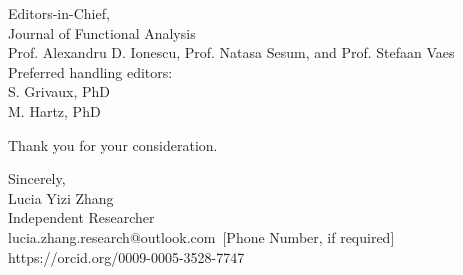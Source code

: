 \documentclass[11pt]{letter}
\begin{document}
\begin{letter}{Editors-in-Chief, \\ Journal of Functional Analysis\\
Prof. Alexandru D. Ionescu, Prof. Natasa Sesum, and Prof. Stefaan Vaes}
Preferred handling editors:\\
S. Grivaux, PhD\\
M. Hartz, PhD

Thank you for your consideration.

\closing{Sincerely,\\[1em]
\vspace{1em}
Lucia Yizi Zhang \\
Independent Researcher\\
lucia.zhang.research@outlook.com\
[Phone Number, if required] \\
https://orcid.org/0009-0005-3528-7747}

\end{letter}
\end{document}
